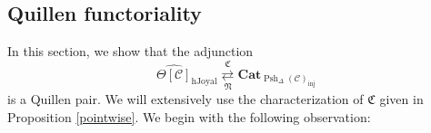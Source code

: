 \documentclass[leqno]{article}
\numberwithin{equation}{subsection}
\theoremstyle{plain}   %
\newtheorem{prop}[equation]{Proposition}
\newtheorem{cor}[equation]{Corollary}
\theoremstyle{remark}
\theoremstyle{plain}
\newcommand{\Nec}{\ensuremath{{\mathcal{N}ec}}}
\newcommand{\Cat}{\ensuremath{\mathbf{Cat}}}
\newcommand{\overcat}[2]{{\left(#1\downarrow #2\right)}}
\renewcommand{\C}{\ensuremath{\mathcal{C}}}
\newcommand{\cellset}{\ensuremath{\widehat{\Theta[\mathcal{C}]}}}
\newcommand{\spsh}{\ensuremath{\operatorname{Psh}_\Delta(\mathcal{C})}}
\begin{document}
\begin{comment}
		When \(\mathcal{G}\) is closed under wedges, we can define the \(\spsh\)-enriched category \(\mathfrak{C}^{\mathcal{G}}(X)	\) to be the category whose objects are the vertices of \(X\) and whose Hom-objects are
		\[\mathfrak{C}^{\mathcal{G}}(X)(x,y)_\cdot.\]
		This defines an enriched category by taking the composition operation to be concatenation of gadgets, which works since \	(\mathcal{G}\) is closed under wedges.
	\end{defn}
	\begin{prop}\label{gadgetlemma}
		Given a \(\C\)-cellular set \(X\) and two vertices \(x,y\) of \(X\) and a category of gadgets \(\mathcal{G}\) the map \	[N\overcat{\Nec^\mathbf{sp}_c}{X_{x,y}} \hookrightarrow N\overcat{\mathcal{G}_c}{X_{x,y}}\] is a weak homotopy 	equivalence.
	\end{prop}
	\begin{proof}
		By Quillen's theorem A, it suffices to look at the overcategories \(\overcat{\Nec^\mathbf{sp}_c}{G(c)}\) along the 	inclusion \(\Nec^\mathbf{sp}_c\hookrightarrow \mathcal{G}_c\) for all \(G\) in \(\mathcal{G}\) and show that their nerves 	are contractible, but these overcategories correspond on-the-nose to the subcategories classifying the diagonal component 	of \(\mathfrak{C}^\Nec(G)(\alpha,\omega)\), which is contractible because \(G\) is a gadget.
	\end{proof}
	\begin{cor}
		The constructions \(\mathfrak{C}^\Nec\) and \(\mathfrak{C}^\mathcal{G}\) are naturally weakly equivalent when \(\mathcal	{G}\) is closed under wedges.
	\end{cor}
	\begin{proof}
		The map between the two constructions is the identity on objects and induces Hom-wise weak equivalences of simplicial 	presheaves.
	\end{proof}
\end{comment}


\subsection{Quillen functoriality}
In this section, we show that the adjunction \[\cellset_{\mathrm{hJoyal}} \underset{\mathfrak{N}}{\overset{\mathfrak{C}}{\rightleftarrows}} \Cat_{\spsh_{\mathrm{inj}}}\] is a Quillen pair. We will extensively use the characterization of \(\mathfrak{C}\) given in Proposition \ref{pointwise}.  We begin with the following observation:
\end{document}
